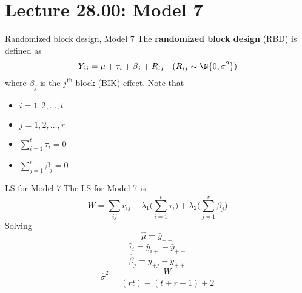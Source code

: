 \section{Lecture 28.00: Model 7}
\begin{Definition}{Randomized block design, Model 7}{}
    The \textbf{randomized block design} (RBD) is defined as
    \[ Y_{ij}=\mu+\tau_i+\beta_j+R_{ij}\quad(R_{ij} \sim \N{0,\sigma^2}) \]
    where $ \beta_j $ is the $ j^{\text{th}} $ block (BIK) effect. Note that
    \begin{itemize}
        \item $ i=1,2,\ldots,t $
        \item $ j=1,2,\ldots,r $
        \item $ \sum_{i=1}^t \tau_i=0  $
        \item $\sum_{j=1}^{r} \beta_j=0$
    \end{itemize}
\end{Definition}
\begin{Example}{LS for Model 7}{}
    The LS for Model 7 is
    \[ W=\sum_{ij}r_{ij}+\lambda_1\biggl(\sum_{i=1}^{t} \tau_i\biggr)+
        \lambda_2 \biggl(\sum_{j=1}^{r} \beta_j\biggr)  \]
    Solving
    \[ \hat{\mu}=\bar{y}_{++} \]
    \[ \hat{\tau}_i=\bar{y}_{i+}-\bar{y}_{++} \]
    \[ \hat{\beta}_j=\bar{y}_{+j}-\bar{y}_{++} \]
    \[ \hat{\sigma}^2=\frac{W}{(rt)-(t+r+1)+2} \]
\end{Example}

